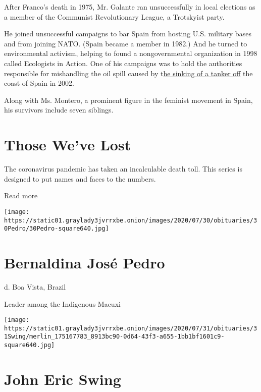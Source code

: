 After Franco's death in 1975, Mr. Galante ran unsuccessfully in local
elections as a member of the Communist Revolutionary League, a
Trotskyist party.

He joined unsuccessful campaigns to bar Spain from hosting U.S. military
bases and from joining NATO. (Spain became a member in 1982.) And he
turned to environmental activism, helping to found a nongovernmental
organization in 1998 called Ecologists in Action. One of his campaigns
was to hold the authorities responsible for mishandling the oil spill
caused by
t\href{https://www.nytimes3xbfgragh.onion/2002/11/19/international/oil-tanker-sinks-off-spain-threatening-disaster.html}{he
sinking of a tanker off} the coast of Spain in 2002.

Along with Ms. Montero, a prominent figure in the feminist movement in
Spain, his survivors include seven siblings.

\href{https://www.nytimes3xbfgragh.onion/interactive/2020/obituaries/people-died-coronavirus-obituaries.html?action=click\&pgtype=Article\&state=default\&region=BELOW_MAIN_CONTENT\&context=covid_obits_promo}{}

\hypertarget{those-weve-lost}{%
\section{Those We've Lost}\label{those-weve-lost}}

The coronavirus pandemic has taken an incalculable death toll. This
series is designed to put names and faces to the numbers.

Read more

\texttt{[image: https://static01.graylady3jvrrxbe.onion/images/2020/07/30/obituaries/30Pedro/30Pedro-square640.jpg]}

\hypertarget{bernaldina-josuxe9-pedro}{%
\section{Bernaldina José Pedro}\label{bernaldina-josuxe9-pedro}}

d. Boa Vista, Brazil

Leader among the Indigenous Macuxi

\texttt{[image: https://static01.graylady3jvrrxbe.onion/images/2020/07/31/obituaries/31Swing/merlin\_175167783\_8913bc90-0d64-43f3-a655-1bb1bf1601c9-square640.jpg]}

\hypertarget{john-eric-swing}{%
\section{John Eric Swing}\label{john-eric-swing}}

